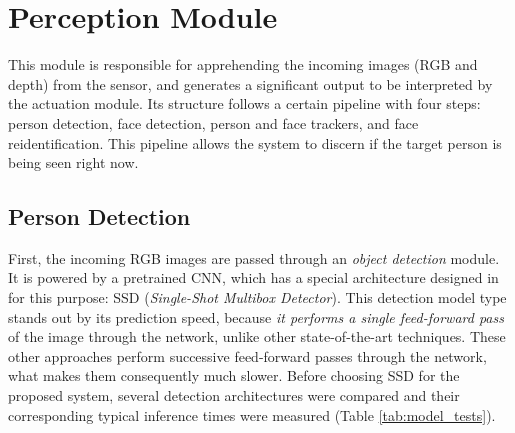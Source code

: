 \section{Perception Module}

This module is responsible for apprehending the incoming images (RGB and depth) from the sensor, and generates a significant output to be interpreted by the actuation module. Its structure follows a certain pipeline with four steps: person detection, face detection, person and face trackers, and face reidentification. This pipeline allows the system to discern if the target person is being seen right now. 

\subsection{Person Detection}

First, the incoming RGB images are passed through an \emph{object detection} module. It is powered by a pretrained CNN, which has a special architecture designed in \cite{ssd} for this purpose: SSD (\emph{Single-Shot Multibox Detector}). This detection model type stands out by its prediction speed, because \emph{it performs a single feed-forward pass} of the image through the network, unlike other state-of-the-art techniques. These other approaches perform successive feed-forward passes through the network, what makes them consequently much slower. Before choosing SSD for the proposed system, several detection architectures were compared and their corresponding typical inference times were measured (Table \ref{tab:model_tests}).


